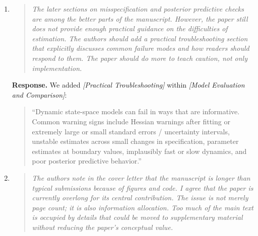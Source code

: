 \documentclass[11pt]{article}
\newcommand{\response}{\textbf{Response.} }
\newcommand{\secit}[1]{\textit{[#1]}}
\newcommand{\msq}[1]{\begin{quote}\small\noindent``#1''\end{quote}}
\newenvironment{reviewerpoint}{\begin{quote}\itshape}{\end{quote}}
\begin{document}
\begin{enumerate}[label=\textbf{Reviewer 2, Main Concern \arabic*.}]
\begin{reviewerpoint}
The manuscript needs stronger guidance on assumptions, identification, and model choice.
The tutorial is effective at demonstrating how one can move from simple to more complex models.
However, it is far less effective at telling readers when they should do so, and on what basis.
This is a serious omission.
A strong methods tutorial should not only demonstrate that a model can be fit; it should also help the reader decide: when linear growth is inadequate, when state dependence is warranted, when system noise should be distinguished from measurement error, when interactions or time-varying moderation are theoretically justified, and when data are too weak to support these expansions.
\end{reviewerpoint}

\response We revised the manuscript to make the rationale for model extensions more explicit, and placed an expanded model evaluation section earlier in the tutorial sequence.
We frame model choice as triangulation among theory, measurement design, observation density, model-implied behavior, diagnostics, and parsimony, rather than as a clean automatic selection rule.
\item

\begin{reviewerpoint}
The later sections on misspecification and posterior predictive checks are among the better parts of the manuscript.
However, the paper still does not provide enough practical guidance on the difficulties of estimation.
The authors should add a practical troubleshooting section that explicitly discusses common failure modes and how readers should respond to them.
The paper should do more to teach caution, not only implementation.
\end{reviewerpoint}

\response We added \secit{Practical Troubleshooting} within \secit{Model Evaluation and Comparison}:
\msq{Dynamic state-space models can fail in ways that are informative.
Common warning signs include Hessian warnings after fitting or extremely large or small standard errors / uncertainty intervals, unstable estimates across small changes in specification, parameter estimates at boundary values, implausibly fast or slow dynamics, and poor posterior predictive behavior.}
\item

\begin{reviewerpoint}
The authors note in the cover letter that the manuscript is longer than typical submissions because of figures and code.
I agree that the paper is currently overlong for its central contribution.
The issue is not merely page count; it is also information allocation.
Too much of the main text is occupied by details that could be moved to supplementary material without reducing the paper's conceptual value.
\end{reviewerpoint}


\end{enumerate}
\end{document}
